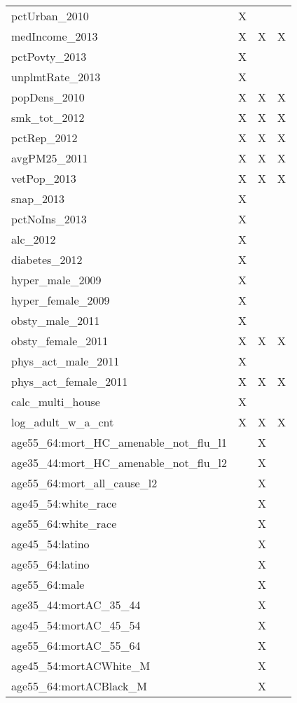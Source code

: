 \begin{table}[ht]
\begin{tabular}{llll}
  pctUrban\_2010 & X &  &  \\ 
  medIncome\_2013 & X & X & X \\ 
  pctPovty\_2013 & X &  &  \\ 
  unplmtRate\_2013 & X &  &  \\ 
  popDens\_2010 & X & X & X \\ 
  smk\_tot\_2012 & X & X & X \\ 
  pctRep\_2012 & X & X & X \\ 
  avgPM25\_2011 & X & X & X \\ 
  vetPop\_2013 & X & X & X \\ 
  snap\_2013 & X &  &  \\ 
  pctNoIns\_2013 & X &  &  \\ 
  alc\_2012 & X &  &  \\ 
  diabetes\_2012 & X &  &  \\ 
  hyper\_male\_2009 & X &  &  \\ 
  hyper\_female\_2009 & X &  &  \\ 
  obsty\_male\_2011 & X &  &  \\ 
  obsty\_female\_2011 & X & X & X \\ 
  phys\_act\_male\_2011 & X &  &  \\ 
  phys\_act\_female\_2011 & X & X & X \\ 
  calc\_multi\_house & X &  &  \\ 
  log\_adult\_w\_a\_cnt & X & X & X \\ 
  age55\_64:mort\_HC\_amenable\_not\_flu\_l1 &  & X &  \\ 
  age35\_44:mort\_HC\_amenable\_not\_flu\_l2 &  & X &  \\ 
  age55\_64:mort\_all\_cause\_l2 &  & X &  \\ 
  age45\_54:white\_race &  & X &  \\ 
  age55\_64:white\_race &  & X &  \\ 
  age45\_54:latino &  & X &  \\ 
  age55\_64:latino &  & X &  \\ 
  age55\_64:male &  & X &  \\ 
  age35\_44:mortAC\_35\_44 &  & X &  \\ 
  age45\_54:mortAC\_45\_54 &  & X &  \\ 
  age55\_64:mortAC\_55\_64 &  & X &  \\ 
  age45\_54:mortACWhite\_M &  & X &  \\ 
  age55\_64:mortACBlack\_M &  & X &  \\ 

\end{tabular}
\end{table}
